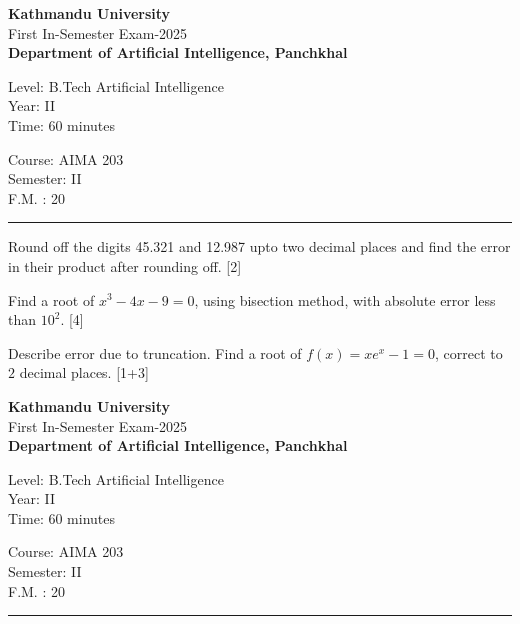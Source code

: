 \documentclass[12pt]{exam}
\begin{document}
\begin{center}
 {\bfseries  { Kathmandu University}} \\[-1mm]
 First In-Semester Exam-2025\\[-2mm]
 {\small \textbf{Department of Artificial Intelligence, Panchkhal}}
\end{center}
\begin{minipage}{0.70\linewidth}
  \small
  \begin{flushleft}
    Level: B.Tech Artificial Intelligence \\
    Year: II \\
    Time: 60 minutes
  \end{flushleft}
\end{minipage} \hfill
\begin{minipage}{0.25\linewidth}
  \begin{flushleft}
    Course: AIMA 203 \\
    Semester: II \\
    F.M. : 20
  \end{flushleft}
\end{minipage}
\vskip 1mm
\rule{\textwidth}{1pt}
\vskip -5mm
\begin{questions}

\question Round off the digits 45.321 and 12.987 upto two decimal places and find the error in their product after rounding off. [2]

\question Find a root of $x^3-4x-9=0$, using bisection method, with absolute error less than $10^2$. [4]

\question Describe error due to truncation. Find a root of \(f(x)=xe^x-1=0\), correct to \(2\) decimal places. [1+3]
\end{questions}

\vspace{3cm}
\begin{center}
 {\bfseries  { Kathmandu University}} \\[-1mm]
 First In-Semester Exam-2025\\[-2mm]
 {\small \textbf{Department of Artificial Intelligence, Panchkhal}}
\end{center}
\begin{minipage}{0.70\linewidth}
  \small
  \begin{flushleft}
    Level: B.Tech Artificial Intelligence \\
    Year: II \\
    Time: 60 minutes
  \end{flushleft}
\end{minipage} \hfill
\begin{minipage}{0.25\linewidth}
  \begin{flushleft}
    Course: AIMA 203 \\
    Semester: II \\
    F.M. : 20
  \end{flushleft}
\end{minipage}
\vskip 1mm
\rule{\textwidth}{1pt}
\end{document}
